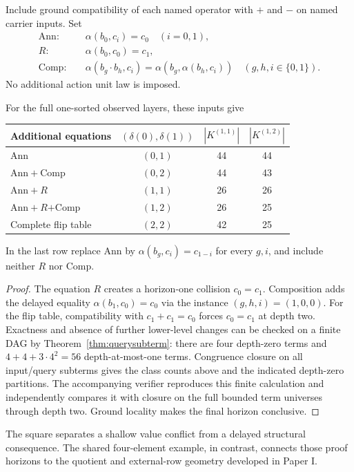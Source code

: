 Include ground compatibility of each named operator with $+$ and $-$ on named carrier inputs. Set
\begin{align*}
\mathrm{Ann}:&\quad \alpha(b_0,c_i)=c_0\quad(i=0,1),\\
R:&\quad \alpha(b_0,c_0)=c_1,\\
\mathrm{Comp}:&\quad \alpha(b_g\cdot b_h,c_i)
 =\alpha(b_g,\alpha(b_h,c_i))\quad(g,h,i\in\{0,1\}).
\end{align*}
No additional action unit law is imposed.

\begin{proposition}\label{prop:square}
For the full one-sorted observed layers, these inputs give
\begin{center}
\begin{tabular}{@{}lccc@{}}
\toprule
Additional equations & $(\delta(0),\delta(1))$ & $|K^{(1,1)}|$ & $|K^{(1,2)}|$\\
\midrule
$\mathrm{Ann}$ & $(0,1)$ &44&44\\
$\mathrm{Ann+Comp}$ & $(0,2)$ &44&43\\
$\mathrm{Ann+}R$ & $(1,1)$ &26&26\\
$\mathrm{Ann+}R\mathrm{+Comp}$ & $(1,2)$ &26&25\\
Complete flip table & $(2,2)$ &42&25\\
\bottomrule
\end{tabular}
\end{center}
In the last row replace $\mathrm{Ann}$ by $\alpha(b_g,c_i)=c_{1-i}$ for every $g,i$, and include neither $R$ nor $\mathrm{Comp}$.
\end{proposition}
\begin{proof}
The equation $R$ creates a horizon-one collision $c_0=c_1$. Composition adds the delayed equality $\alpha(b_1,c_0)=c_0$ via the instance $(g,h,i)=(1,0,0)$. For the flip table, compatibility with $c_1+c_1=c_0$ forces $c_0=c_1$ at depth two. Exactness and absence of further lower-level changes can be checked on a finite DAG by Theorem~\ref{thm:querysubterm}: there are four depth-zero terms and $4+4+3\cdot4^2=56$ depth-at-most-one terms. Congruence closure on all input/query subterms gives the class counts above and the indicated depth-zero partitions. The accompanying verifier reproduces this finite calculation and independently compares it with closure on the full bounded term universes through depth two. Ground locality makes the final horizon conclusive.
\end{proof}

The square separates a shallow value conflict from a delayed structural consequence. The shared four-element example, in contrast, connects those proof horizons to the quotient and external-row geometry developed in Paper I.

